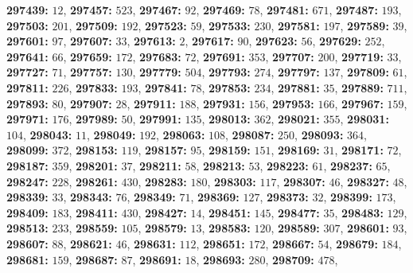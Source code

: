 \textsf{\bfseries 297439:} $12$, \textsf{\bfseries 297457:} $523$, \textsf{\bfseries 297467:} $92$, \textsf{\bfseries 297469:} $78$, \textsf{\bfseries 297481:} $671$, \textsf{\bfseries 297487:} $193$, \textsf{\bfseries 297503:} $201$, \textsf{\bfseries 297509:} $192$, \textsf{\bfseries 297523:} $59$, \textsf{\bfseries 297533:} $230$, \textsf{\bfseries 297581:} $197$, \textsf{\bfseries 297589:} $39$, \textsf{\bfseries 297601:} $97$, \textsf{\bfseries 297607:} $33$, \textsf{\bfseries 297613:} $2$, \textsf{\bfseries 297617:} $90$, \textsf{\bfseries 297623:} $56$, \textsf{\bfseries 297629:} $252$, \textsf{\bfseries 297641:} $66$, \textsf{\bfseries 297659:} $172$, \textsf{\bfseries 297683:} $72$, \textsf{\bfseries 297691:} $353$, \textsf{\bfseries 297707:} $200$, \textsf{\bfseries 297719:} $33$, \textsf{\bfseries 297727:} $71$, \textsf{\bfseries 297757:} $130$, \textsf{\bfseries 297779:} $504$, \textsf{\bfseries 297793:} $274$, \textsf{\bfseries 297797:} $137$, \textsf{\bfseries 297809:} $61$, \textsf{\bfseries 297811:} $226$, \textsf{\bfseries 297833:} $193$, \textsf{\bfseries 297841:} $78$, \textsf{\bfseries 297853:} $234$, \textsf{\bfseries 297881:} $35$, \textsf{\bfseries 297889:} $711$, \textsf{\bfseries 297893:} $80$, \textsf{\bfseries 297907:} $28$, \textsf{\bfseries 297911:} $188$, \textsf{\bfseries 297931:} $156$, \textsf{\bfseries 297953:} $166$, \textsf{\bfseries 297967:} $159$, \textsf{\bfseries 297971:} $176$, \textsf{\bfseries 297989:} $50$, \textsf{\bfseries 297991:} $135$, \textsf{\bfseries 298013:} $362$, \textsf{\bfseries 298021:} $355$, \textsf{\bfseries 298031:} $104$, \textsf{\bfseries 298043:} $11$, \textsf{\bfseries 298049:} $192$, \textsf{\bfseries 298063:} $108$, \textsf{\bfseries 298087:} $250$, \textsf{\bfseries 298093:} $364$, \textsf{\bfseries 298099:} $372$, \textsf{\bfseries 298153:} $119$, \textsf{\bfseries 298157:} $95$, \textsf{\bfseries 298159:} $151$, \textsf{\bfseries 298169:} $31$, \textsf{\bfseries 298171:} $72$, \textsf{\bfseries 298187:} $359$, \textsf{\bfseries 298201:} $37$, \textsf{\bfseries 298211:} $58$, \textsf{\bfseries 298213:} $53$, \textsf{\bfseries 298223:} $61$, \textsf{\bfseries 298237:} $65$, \textsf{\bfseries 298247:} $228$, \textsf{\bfseries 298261:} $430$, \textsf{\bfseries 298283:} $180$, \textsf{\bfseries 298303:} $117$, \textsf{\bfseries 298307:} $46$, \textsf{\bfseries 298327:} $48$, \textsf{\bfseries 298339:} $33$, \textsf{\bfseries 298343:} $76$, \textsf{\bfseries 298349:} $71$, \textsf{\bfseries 298369:} $127$, \textsf{\bfseries 298373:} $32$, \textsf{\bfseries 298399:} $173$, \textsf{\bfseries 298409:} $183$, \textsf{\bfseries 298411:} $430$, \textsf{\bfseries 298427:} $14$, \textsf{\bfseries 298451:} $145$, \textsf{\bfseries 298477:} $35$, \textsf{\bfseries 298483:} $129$, \textsf{\bfseries 298513:} $233$, \textsf{\bfseries 298559:} $105$, \textsf{\bfseries 298579:} $13$, \textsf{\bfseries 298583:} $120$, \textsf{\bfseries 298589:} $307$, \textsf{\bfseries 298601:} $93$, \textsf{\bfseries 298607:} $88$, \textsf{\bfseries 298621:} $46$, \textsf{\bfseries 298631:} $112$, \textsf{\bfseries 298651:} $172$, \textsf{\bfseries 298667:} $54$, \textsf{\bfseries 298679:} $184$, \textsf{\bfseries 298681:} $159$, \textsf{\bfseries 298687:} $87$, \textsf{\bfseries 298691:} $18$, \textsf{\bfseries 298693:} $280$, \textsf{\bfseries 298709:} $478$, 
